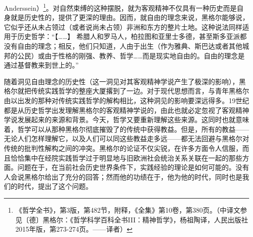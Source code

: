 Anderssein）\footnote{《哲学全书》，第3版，第482节，附释，《全集》第10卷，第380页。（中译文参见〔德〕黑格尔：《哲学科学百科全书III：精神哲学》，杨祖陶译，人民出版社2015年版，第273-274页。——译者）}。对自然束缚的这种摆脱，就为客观精神不仅具有一种历史而是自身就是历史性的，提供了更深的理由。因而，就自由的理念来说，黑格尔能够说，它似乎还从未占领过（或者说尚未占领）非洲和东方的整片土地。这种说法同样适用于历史哲学：“【……】 希腊人和罗马人，柏拉图和亚里士多德，甚至斯多亚派都没有自由的理念；相反，他们只知道，人由于出生（作为雅典、斯巴达或者其他城邦的公民）或由于性格的刚强、教养、哲学……而是现实地自由的。自由的理念是通过基督教来到世上的。”

随着洞见自由理念的历史性（这一洞见对其客观精神学说产生了极深的影响），黑格尔就把传统实践哲学的整座大厦撂到了一边。对于现代思想而言，与青年黑格尔由以出发的那种对传统实践哲学的解构相比，这种洞见的影响要深远得多。19世纪都是从历史哲学出发理解黑格尔的客观精神学说的，由此也就必定忽视了客观精神学说发展起来的来源和背景。今天，哲学又要重新理解这些来源。这同时也就意味着，哲学可以从那种黑格尔彻底摧毁了的传统中获得教益。但是，所有的教益——无论人们怎样理解它，以及人们可以同这些教益走多远——都无法回避与黑格尔对传统的批判性解构之间的冲突。黑格尔的论证不仅尖锐，在许多方面令人信服，而且恰恰集中在经院实践哲学过于明显地与旧欧洲社会统治关系关联在一起的那些方面。问题在于，在当前社会历史世界条件下，实践经验的理论是如何可能的。没有人会说黑格尔给出了充分的回答；然而他的功绩在于，他为他的时代，同时也是我们的时代，提出了这个问题。